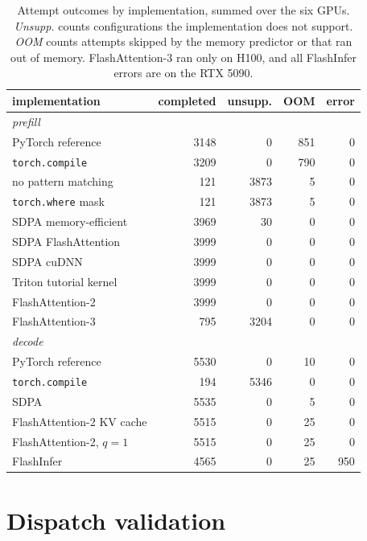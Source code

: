 \documentclass[11pt]{article}
\newcommand{\code}[1]{\texttt{\small #1}}
\begin{document}
\begin{table}[tb]
\centering
\small
\setlength{\tabcolsep}{2.5pt}
\begin{tabular}{lrrrr}
\toprule
implementation & completed & unsupp. & OOM & error \\
\midrule
\multicolumn{5}{l}{\emph{prefill}} \\
PyTorch reference             & 3148 & 0    & 851 & 0 \\
\code{torch.compile}          & 3209 & 0    & 790 & 0 \\
\quad no pattern matching     & 121  & 3873 & 5   & 0 \\
\quad \code{torch.where} mask & 121  & 3873 & 5   & 0 \\
SDPA memory-efficient         & 3969 & 30   & 0   & 0 \\
SDPA FlashAttention           & 3999 & 0    & 0   & 0 \\
SDPA cuDNN                    & 3999 & 0    & 0   & 0 \\
Triton tutorial kernel        & 3999 & 0    & 0   & 0 \\
FlashAttention-2              & 3999 & 0    & 0   & 0 \\
FlashAttention-3              & 795  & 3204 & 0   & 0 \\
\midrule
\multicolumn{5}{l}{\emph{decode}} \\
PyTorch reference             & 5530 & 0    & 10  & 0 \\
\code{torch.compile}          & 194  & 5346 & 0   & 0 \\
SDPA                          & 5535 & 0    & 5   & 0 \\
FlashAttention-2 KV cache     & 5515 & 0    & 25  & 0 \\
FlashAttention-2, $q=1$       & 5515 & 0    & 25  & 0 \\
FlashInfer                    & 4565 & 0    & 25  & 950 \\
\bottomrule
\end{tabular}
\caption{Attempt outcomes by implementation, summed over the six GPUs.
\emph{Unsupp.} counts configurations the implementation does not support.
\emph{OOM} counts attempts skipped by the memory predictor or that ran out of
memory. FlashAttention-3 ran only on H100, and all FlashInfer errors are on the
RTX 5090.}
\label{tab:avail}
\end{table}

\section{Dispatch validation}
\end{document}
